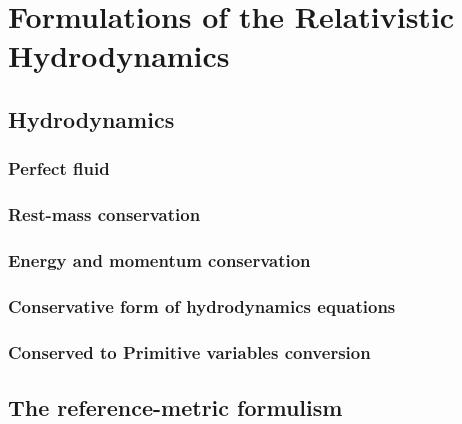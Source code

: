 
\chapter{Formulations of the Relativistic Hydrodynamics}  %

\ifpdf
    \graphicspath{{Chapter2/Figs/PDF/}{Chapter2/Figs/}}
\else
    \graphicspath{{Chapter2/Figs/}}
\fi


\section{Hydrodynamics} %

\subsection{Perfect fluid}
\subsection{Rest-mass conservation}
\subsection{Energy and momentum conservation}
\subsection{Conservative form of hydrodynamics equations}
\subsection{Conserved to Primitive variables conversion}  %

\section{The reference-metric formulism} %
\label{section2.2}

